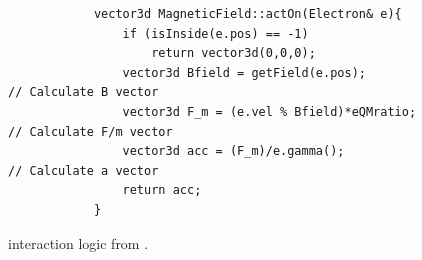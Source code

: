 \documentclass[a4paper,oneside,12pt]{report}
\numberwithin{equation}{chapter}
\begin{document}
\vspace{20pt}
\begin{figure}[H]
        \begin{verbatim}
            vector3d MagneticField::actOn(Electron& e){
                if (isInside(e.pos) == -1)
                    return vector3d(0,0,0);
                vector3d Bfield = getField(e.pos);                        // Calculate B vector
                vector3d F_m = (e.vel % Bfield)*eQMratio;                 // Calculate F/m vector
                vector3d acc = (F_m)/e.gamma();                           // Calculate a vector
                return acc;
            }
        \end{verbatim}
    \vspace{20pt}
    \caption{\eB interaction logic from .}
    \label{fig:3D_e_B_interaction_first}
\end{figure}
\end{document}
